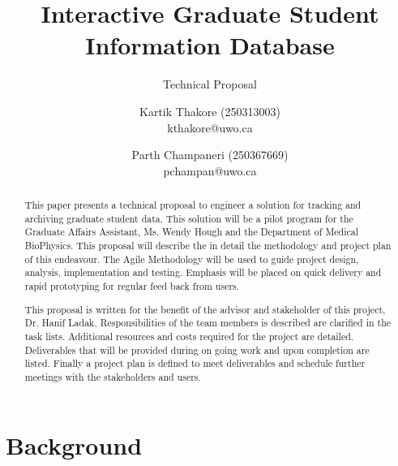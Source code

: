 \documentclass{journal}
\begin{document}

\title{Interactive Graduate Student Information Database}
\subtitle{Technical Proposal} 
\author{Kartik Thakore (250313003)\\kthakore@uwo.ca \and Parth Champaneri (250367669)\\pchampan@uwo.ca}
\maketitle

\begin{abstract}
This paper presents a technical proposal to engineer a solution for tracking and archiving graduate student data. This solution will be a pilot program for the Graduate Affairs Assistant, Ms. Wendy Hough and the Department of Medical BioPhysics. This proposal will describe the in detail the methodology and project plan of this endeavour. The Agile Methodology will be used to guide project design, analysis, implementation and testing. Emphasis will be placed on quick delivery and rapid prototyping for regular feed back from users. 

This proposal is written for the benefit of the advisor and stakeholder of this project, Dr. Hanif Ladak. Responsibilities of the team members is described are clarified in the task lists. Additional resources and costs required for the project are detailed. Deliverables that will be provided during on going work and upon completion are listed. Finally a project plan is defined to meet deliverables and schedule further meetings with the stakeholders and users.
\end{abstract}

\section{Background}
 
\end{document}

